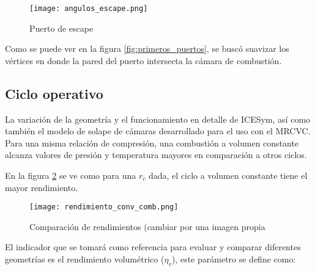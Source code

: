 \begin{figure}
    \centering
    \texttt{[image: angulos\_escape.png]}
    \caption{Puerto de escape}
    \label{fig:angulos_escape}
\end{figure}

Como se puede ver en la figura \ref{fig:primeros_puertos}, se buscó suavizar
los vértices en donde la pared del puerto intersecta la cámara de combustión.
%


\subsection{Ciclo operativo}
%
La variación de la geometría y el funcionamiento en detalle de ICESym, así como
también el modelo de solape de cámaras desarrollado para el uso con el MRCVC.
%
Para una misma relación de compresión, una combustión a volumen constante
alcanza valores de presión y temperatura mayores en comparación a otros ciclos.
%


En la figura \ref{fig:comparacion_rendimientos} se ve como para una $r_c$ dada,
el ciclo a volumen constante tiene el mayor rendimiento.

\begin{figure}
    \centering
    \texttt{[image: rendimiento\_conv\_comb.png]}
    \caption{Comparación de rendimientos (cambiar por una imagen propia}
    \label{fig:comparacion_rendimientos}
\end{figure}


%
%
%
%

El indicador que se tomará como referencia para evaluar y comparar diferentes
geometrías es el rendimiento volumétrico ($\eta_v$), este parámetro se define
como:

